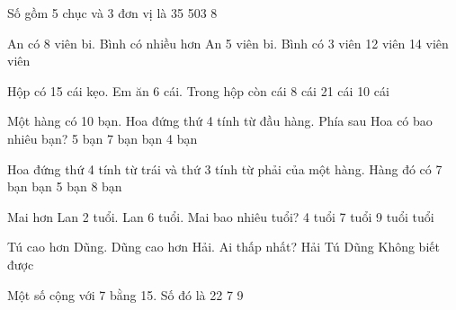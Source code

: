 \documentclass[../main.tex]{subfiles}
\begin{document}
\begin{ex}
  Số gồm 5 chục và 3 đơn vị là
  \choice
  {}
  {35}
  {503}
  {8}
\end{ex}

\begin{ex}
  An có 8 viên bi. Bình có nhiều hơn An 5 viên bi. Bình có
  \choice
  {3 viên}
  {12 viên}
  {14 viên}
  { viên}
\end{ex}

\begin{ex}
  Hộp có 15 cái kẹo. Em ăn 6 cái. Trong hộp còn
  \choice
  { cái}
  {8 cái}
  {21 cái}
  {10 cái}
\end{ex}

\begin{ex}
  Một hàng có 10 bạn. Hoa đứng thứ 4 tính từ đầu hàng. Phía sau Hoa có bao nhiêu bạn?
  \choice
  {5 bạn}
  {7 bạn}
  { bạn}
  {4 bạn}
\end{ex}

\begin{ex}
  Hoa đứng thứ 4 tính từ trái và thứ 3 tính từ phải của một hàng. Hàng đó có
  \choice
  {7 bạn}
  { bạn}
  {5 bạn}
  {8 bạn}
\end{ex}

\begin{ex}
  Mai hơn Lan 2 tuổi. Lan 6 tuổi. Mai bao nhiêu tuổi?
  \choice
  {4 tuổi}
  {7 tuổi}
  {9 tuổi}
  { tuổi}
\end{ex}

\begin{ex}
  Tú cao hơn Dũng. Dũng cao hơn Hải. Ai thấp nhất?
  \choice
  {\True Hải}
  {Tú}
  {Dũng}
  {Không biết được}
\end{ex}

\begin{ex}
  Một số cộng với 7 bằng 15. Số đó là
  \choice
  {22}
  {7}
  {}
  {9}
\end{ex}
\end{document}
